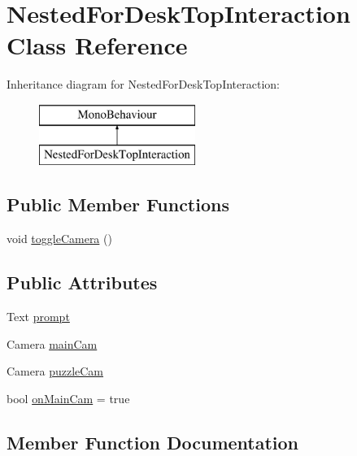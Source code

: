 \hypertarget{class_nested_for_desk_top_interaction}{}\section{Nested\+For\+Desk\+Top\+Interaction Class Reference}
\label{class_nested_for_desk_top_interaction}
Inheritance diagram for Nested\+For\+Desk\+Top\+Interaction\+:\begin{figure}[H]
\begin{center}
\leavevmode
\includegraphics[height=2.000000cm]{class_nested_for_desk_top_interaction}
\end{center}
\end{figure}
\subsection*{Public Member Functions}
\begin{DoxyCompactItemize}
\item 
void \hyperlink{class_nested_for_desk_top_interaction_aa3cd864ad705ec50279c5ad57ba8d81f}{toggle\+Camera} ()
\end{DoxyCompactItemize}
\subsection*{Public Attributes}
\begin{DoxyCompactItemize}
\item 
Text \hyperlink{class_nested_for_desk_top_interaction_a1513d5ef78700420a7d21539bdacb9d3}{prompt}
\item 
Camera \hyperlink{class_nested_for_desk_top_interaction_a457df49c8287eacf8782725a46081520}{main\+Cam}
\item 
Camera \hyperlink{class_nested_for_desk_top_interaction_ab23a4eaa0c552fe591657fb7176b0dfb}{puzzle\+Cam}
\item 
bool \hyperlink{class_nested_for_desk_top_interaction_ab6810aa35ec82dd0f83652b1fd85ad30}{on\+Main\+Cam} = true
\end{DoxyCompactItemize}


\subsection{Member Function Documentation}
\mbox{\label{class_nested_for_desk_top_interaction_aa3cd864ad705ec50279c5ad57ba8d81f}} 
